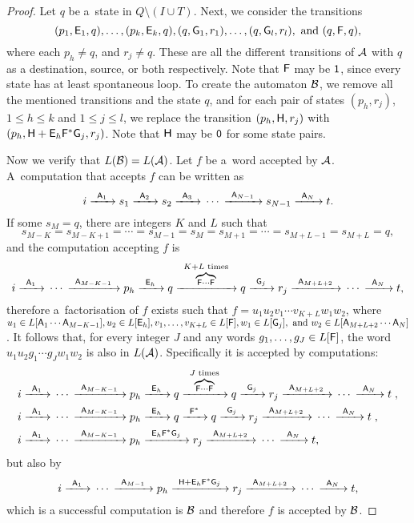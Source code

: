 \begin{proof}
    Let $q$ be a~state in $Q \setminus (I \cup T)$. Next, we consider the transitions
    \[
        (p_1, \re{E}_1, q), \dotsc, (p_k, \re{E}_k, q), (q, \re{G}_1, r_1), \dotsc, (q, \re{G}_l, r_l), \text{ and } (q, \re{F}, q),
    \]
    where each $p_h \neq q$, and $r_j \neq q$. These are all the different transitions of $\aut{A}$ with $q$ as a destination, source, or both respectively. Note that $\re{F}$ may be $\re{1}$, since every state has at least spontaneous loop. To create the automaton $\aut{B}$, we remove all the mentioned transitions and the state $q$, and for each pair of states $(p_h, r_j)$, $1 \leq h \leq k$ and $1 \leq j \leq l$, we replace the transition $(p_h, \re{H}, r_j)$ with $(p_h, \re{H} + \re{E}_h\re{F}^*\re{G}_j, r_j)$. Note that $\re{H}$ may be $\re{0}$ for some state pairs.

    Now we verify that $L(\aut{B}) = L(\aut{A})$. Let $f$ be a~word accepted by $\aut{A}$. A~computation that accepts $f$ can be written as
    \[
        i \tr{\re{A}_1} s_1 \tr{\re{A}_2} s_2 \tr{\re{A}_3} \dotsm \tr{\re{A}_{N-1}} s_{N-1} \tr{\re{A}_N} t.
    \]
    If some $s_M = q$, there are integers $K$ and $L$ such that
    \[
        s_{M-K} = s_{M-K+1} = \dotsb = s_{M-1} = s_M = s_{M+1} = \dotsb = s_{M+L-1} = s_{M+L} = q,
    \]
    and the computation accepting $f$ is
    \[
        i \tr{\re{A}_1} \dotsm \tr{\re{A}_{M-K-1}} p_h \tr{\re{E}_h} q \tr{\overbrace{\scriptstyle \re{F} \dotsm \re{F}}^{\scriptstyle K+L \text{ times}}} q \tr{\re{G}_j} r_j \tr{\re{A}_{M+L+2}} \dotsm \tr{\re{A}_N} t,
    \]
    therefore a~factorisation of $f$ exists such that $f = u_1 u_2 v_1 \dotsm v_{K + L} w_1 w_2$, where $u_1 \in L[\re{A}_1 \dotsm \re{A}_{M-K-1}], u_2 \in L[\re{E}_h], v_1, \dotsc, v_{K+L} \in L[\re{F}], w_1 \in L[\re{G}_j], \text{ and } w_2 \in L[\re{A}_{M+L+2} \dotsm \re{A}_N]$. It follows that, for every integer $J$ and any words $g_1, \dotsc, g_J \in L[\re{F}]$, the word $u_1 u_2 g_1 \dotsm g_J w_1 w_2$ is also in $L(\aut{A})$. Specifically it is accepted by computations:
    \begin{align*}
        i \tr{\re{A}_1} \dotsm \tr{\re{A}_{M-K-1}} &p_h \tr{\re{E}_h} q \tr{\overbrace{\scriptstyle \re{F} \dotsm \re{F}}^{\scriptstyle J \text{ times}}} q \tr{\re{G}_j} r_j \tr{\re{A}_{M+L+2}} \dotsm \tr{\re{A}_N} t \; , \\
        i \tr{\re{A}_1} \dotsm \tr{\re{A}_{M-K-1}} &p_h \tr{\re{E}_h} q \tr{\re{F}^*} q \tr{\re{G}_j} r_j \tr{\re{A}_{M+L+2}} \dotsm \tr{\re{A}_N} t \; , \\
        i \tr{\re{A}_1} \dotsm \tr{\re{A}_{M-K-1}} &p_h \tr{\re{E}_h\re{F}^*\re{G}_j} r_j \tr{\re{A}_{M+L+2}} \dotsm \tr{\re{A}_N} t,
    \end{align*}
    but also by
    \[
        i \tr{\re{A}_1} \dotsm \tr{\re{A}_{M-1}} p_h \tr{\re{H} + \re{E}_h\re{F}^*\re{G}_j} r_j \tr{\re{A}_{M+L+2}} \dotsm \tr{\re{A}_N} t,
    \]
    which is a successful computation is $\aut{B}$ and therefore $f$ is accepted by $\aut{B}$.


\end{proof}
